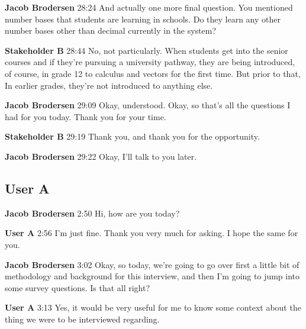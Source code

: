 \documentclass{article}
\begin{document}
\noindent \textbf{Jacob Brodersen}   28:24
And actually one more final question. You mentioned number bases that students are learning in schools. Do they learn any other number bases other than decimal currently in the system?

\noindent \textbf{Stakeholder B}   28:44
No, not particularly. When students get into the senior courses and if they're pursuing a university pathway, they are being introduced, of course, in grade 12 to calculus and vectors for the first time. But prior to that,
In earlier grades, they're not introduced to anything else.

\noindent \textbf{Jacob Brodersen}   29:09
Okay, understood.
Okay, so that's all the questions I had for you today. Thank you for your time.

\noindent \textbf{Stakeholder B}   29:19
Thank you, and thank you for the opportunity.

\noindent \textbf{Jacob Brodersen}   29:22
Okay, I'll talk to you later.

\subsection{User A}

\noindent \textbf{Jacob Brodersen}   2:50
Hi, how are you today?

\noindent \textbf{User A}   2:56
I'm just fine. Thank you very much for asking. I hope the same for you.

\noindent \textbf{Jacob Brodersen}   3:02
Okay, so today, we're going to go over first a little bit of methodology and background for this interview, and then I'm going to jump into some survey questions. Is that all right?

\noindent \textbf{User A}   3:13
Yes, it would be very useful for me to know some context about the thing we were to be interviewed regarding.
\end{document}
